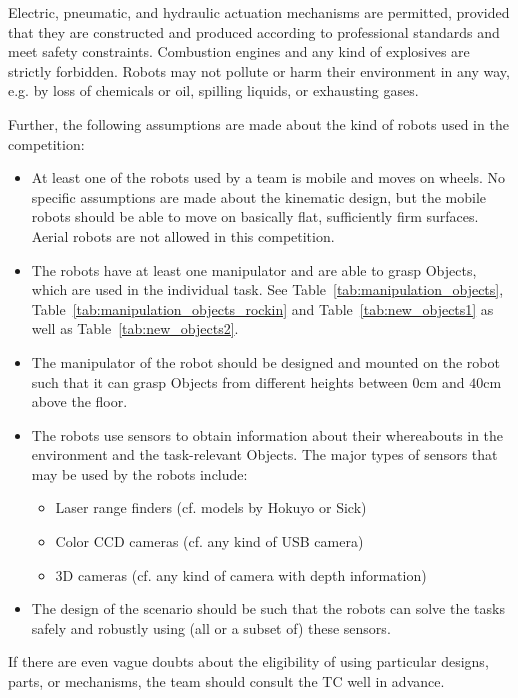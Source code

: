 \par
Electric, pneumatic, and hydraulic actuation mechanisms are permitted, provided that they are constructed and produced according to professional standards and meet safety constraints. Combustion engines and any kind of explosives are strictly forbidden. Robots may not pollute or harm their environment in any way, e.g. by loss of chemicals or oil, spilling liquids, or exhausting gases.
\par
Further, the following assumptions are made about the kind of robots used in the competition:
\par
\begin{itemize}
	\item At least one of the robots used by a team is mobile and moves on wheels. No specific assumptions are made about the kinematic design, but the mobile robots should be able to move on basically flat, sufficiently firm surfaces. Aerial robots are not allowed in this competition. 
	\item The robots have at least one manipulator and are able to grasp Objects, which are used in the individual task. See Table~\ref{tab:manipulation_objects}, Table~\ref{tab:manipulation_objects_rockin} and Table~\ref{tab:new_objects1} as well as Table~\ref{tab:new_objects2}.
	\item The manipulator of the robot should be designed and mounted on the robot such that it can grasp Objects from different heights between $0\si{\centi\meter}$ and $40\si{\centi\meter}$ above the floor.
	\item The robots use sensors to obtain information about their whereabouts in the environment and the task-relevant Objects. The major types of sensors that may be used by the robots include:
	\begin{itemize}
		\item Laser range finders (cf. models by Hokuyo or Sick)
		\item Color CCD cameras (cf. any kind of USB camera)
		\item 3D cameras (cf. any kind of camera with depth information)
	\end{itemize}
	\item The design of the scenario should be such that the robots can solve the tasks safely and robustly using (all or a subset of) these sensors.
\end{itemize}
If there are even vague doubts about the eligibility of using particular designs, parts, or mechanisms, the team should consult the TC well in advance.
